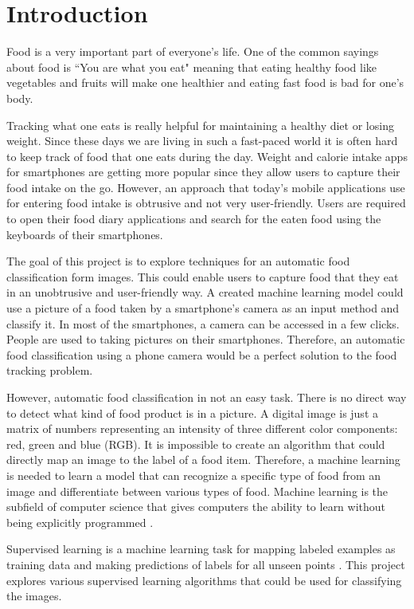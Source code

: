 \chapter{Introduction}

Food is a very important part of everyone’s life.  One of the common sayings about food is ``You are what you eat" meaning that eating healthy food like vegetables and fruits will make one healthier and eating fast food is bad for one's body.  

Tracking what one eats is really helpful for maintaining a healthy diet or losing weight. Since these days we are living in such a fast-paced world it is often hard to keep track of food that one eats during the day. Weight and calorie intake apps for smartphones are getting more popular since they allow users to capture their food intake on the go. However, an approach that today's mobile applications use for entering food intake is obtrusive and not very user-friendly. Users are required to open their food diary applications and search for the eaten food using the keyboards of their smartphones. 

The goal of this project is to explore techniques for an automatic food classification form images. This could enable users to capture food that they eat in an unobtrusive and user-friendly way. A created machine learning model could use a picture of a food taken by a smartphone's camera as an input method and classify it. In most of the smartphones, a camera can be accessed in a few clicks. People are used to taking pictures on their smartphones. Therefore, an automatic food classification using a phone camera would be a perfect solution to the food tracking problem. 

However, automatic food classification in not an easy task. There is no direct way to detect what kind of food product is in a picture. A digital image is just a matrix of numbers representing an intensity of three different color components: red, green and blue (RGB). It is impossible to create an algorithm that could directly map an image to the label of a food item. Therefore, a machine learning is needed to learn a model that can recognize a specific type of food from an image and differentiate between various types of food. Machine learning is the subfield of computer science that gives computers the ability to learn without being explicitly programmed \citep{Samuel}.

Supervised learning is a machine learning task for mapping labeled examples as training data and making predictions of labels for all unseen points \citep{Mohri:2012:FML:2371238}. This project explores various supervised learning algorithms that could be used for classifying the images.

